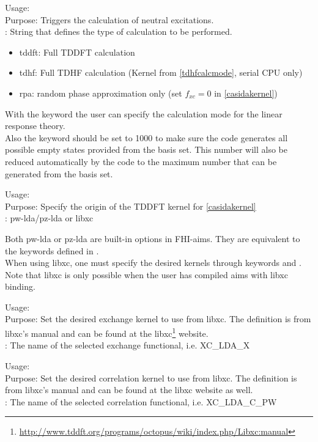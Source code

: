  {
\noindent
Usage:  \\
Purpose: Triggers the calculation of neutral excitations.\\
: String that defines the type of calculation to be performed.
\begin{itemize}
\item tddft: Full TDDFT calculation
\item tdhf: Full TDHF calculation (Kernel from \ref{tdhfcalcmode}, serial CPU only)
\item rpa: random phase approximation only (set $f_{xc}=0$ in \ref{casidakernel})\\
\end{itemize}
}
With the keyword  the user can specify the calculation mode for the linear response theory.\\
Also the keyword  should be set to 1000 to make sure the code generates all
possible empty states provided from the basis set. This number will also be reduced automatically by the code to the maximum number that can be generated from the basis set.

 {
\noindent
Usage:  \\
Purpose: Specify the origin of the TDDFT kernel for \ref{casidakernel}\\
: pw-lda/pz-lda or libxc

Both pw-lda or pz-lda are built-in options in FHI-aims. They are equivalent to the keywords defined in .\\
When using libxc, one must specify the desired kernels through keywords  and . Note that libxc is only possible when the user has compiled aims with libxc binding.
}

 {
\noindent
Usage:  \\
Purpose: Set the desired exchange kernel to use from libxc. The definition is from libxc's manual and can be found at the 
libxc\footnote{\url{http://www.tddft.org/programs/octopus/wiki/index.php/Libxc:manual}} website.\\
: The name of the selected exchange functional, i.e. XC\_LDA\_X
}

 {
\noindent
Usage:  \\
Purpose: Set the desired correlation kernel to use from libxc. The definition is from libxc's manual and can be found at the 
libxc website as well.\\
: The name of the selected correlation functional, i.e. XC\_LDA\_C\_PW
}

